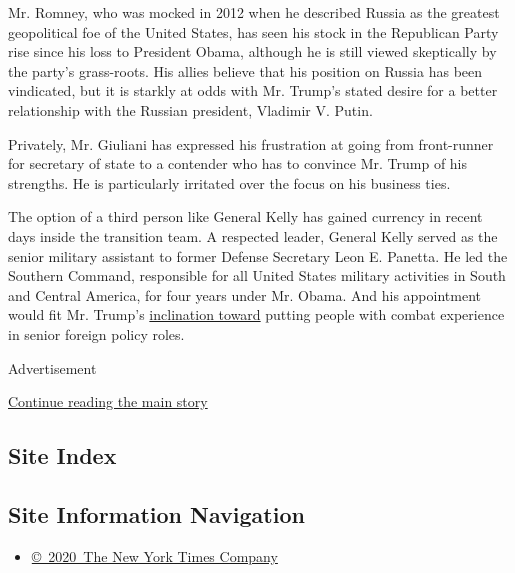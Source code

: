 Mr. Romney, who was mocked in 2012 when he described Russia as the
greatest geopolitical foe of the United States, has seen his stock in
the Republican Party rise since his loss to President Obama, although he
is still viewed skeptically by the party's grass-roots. His allies
believe that his position on Russia has been vindicated, but it is
starkly at odds with Mr. Trump's stated desire for a better relationship
with the Russian president, Vladimir V. Putin.

Privately, Mr. Giuliani has expressed his frustration at going from
front-runner for secretary of state to a contender who has to convince
Mr. Trump of his strengths. He is particularly irritated over the focus
on his business ties.

The option of a third person like General Kelly has gained currency in
recent days inside the transition team. A respected leader, General
Kelly served as the senior military assistant to former Defense
Secretary Leon E. Panetta. He led the Southern Command, responsible for
all United States military activities in South and Central America, for
four years under Mr. Obama. And his appointment would fit Mr. Trump's
\href{http://www.nytimes.com/2016/11/21/us/politics/donald-trump-national-security-military.html}{inclination
toward} putting people with combat experience in senior foreign policy
roles.

Advertisement

\protect\hyperlink{after-bottom}{Continue reading the main story}

\hypertarget{site-index}{%
\subsection{Site Index}\label{site-index}}

\hypertarget{site-information-navigation}{%
\subsection{Site Information
Navigation}\label{site-information-navigation}}

\begin{itemize}
\tightlist
\item
  \href{https://help.nytimes.com/hc/en-us/articles/115014792127-Copyright-notice}{©~2020~The
  New York Times Company}
\end{itemize}

